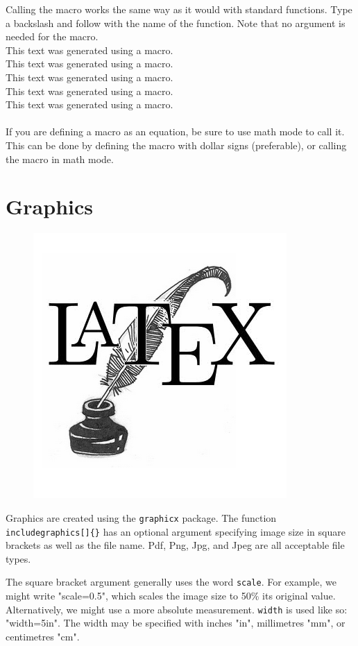 \documentclass[11pt]{article}
\def\macroText{This text was generated using a macro. \\}
\begin{document}
Calling the macro works the same way as it would with standard functions. Type a backslash and follow with the name of the function. Note that no argument is needed for the macro.\\

\macroText 
\macroText
\macroText
\macroText
\macroText \\
If you are defining a macro as an equation, be sure to use math mode to call it. This can be done by defining the macro with dollar signs (preferable), or calling the macro in math mode.

\section{Graphics}

\begin{figure}[h]
	\includegraphics[scale=0.25]{logo.png}
\end{figure}

Graphics are created using the \texttt{graphicx} package.
The function \texttt{includegraphics[]\{\}} has an optional argument specifying image size in square brackets as well as the file name. Pdf, Png, Jpg, and Jpeg are all acceptable file types.

The square bracket argument generally uses the word \texttt{scale}. For example, we might write "scale=0.5", which scales the image size to 50\% its original value. Alternatively, we might use a more absolute measurement. \texttt{width} is used like so: "width=5in". The width may be specified with inches "in", millimetres "mm", or centimetres "cm". 
\end{document}
